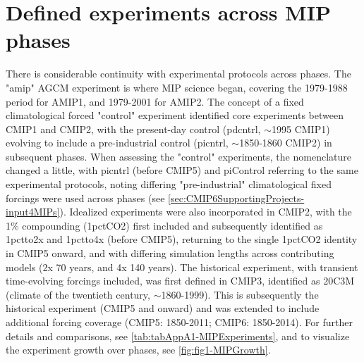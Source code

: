 \documentclass[gmd, preprint]{copernicus}
\begin{document}
\section{Defined experiments across MIP phases}  %
\label{sec:secAppA1-MIPExperiments}
There is considerable continuity with experimental protocols across phases. The "amip" AGCM experiment is where MIP science began, covering the 1979-1988 period for AMIP1, and 1979-2001 for AMIP2. The concept of a fixed climatological forced "control" experiment identified core experiments between CMIP1 and CMIP2, with the present-day control (pdcntrl, $\sim$1995 CMIP1) evolving to include a pre-industrial control (picntrl, $\sim$1850-1860 CMIP2) in subsequent phases. When assessing the "control" experiments, the nomenclature changed a little, with picntrl (before CMIP5) and piControl referring to the same experimental protocols, noting differing "pre-industrial" climatological fixed forcings were used across phases (see \autoref{sec:CMIP6SupportingProjects-input4MIPs}). Idealized experiments were also incorporated in CMIP2, with the 1\% compounding (1pctCO2) first included and subsequently identified as 1pctto2x and 1pctto4x (before CMIP5), returning to the single 1pctCO2 identity in CMIP5 onward, and with differing simulation lengths across contributing models (2x 70 years, and 4x 140 years). The historical experiment, with transient time-evolving forcings included, was first defined in CMIP3, identified as 20C3M (climate of the twentieth century, $\sim$1860-1999). This is subsequently the historical experiment (CMIP5 and onward) and was extended to include additional forcing coverage (CMIP5: 1850-2011; CMIP6: 1850-2014). For further details and comparisons, see \autoref{tab:tabAppA1-MIPExperiments}, and to visualize the experiment growth over phases, see \autoref{fig:fig1-MIPGrowth}.
\end{document}
